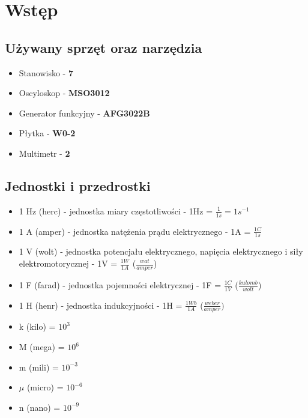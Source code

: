 \chapter{Wstęp}

\section{Używany sprzęt oraz narzędzia}

\begin{itemize}
    \item Stanowisko - \textbf{7}
    \item Oscyloskop - \textbf{MSO3012}
    \item Generator funkcyjny - \textbf{AFG3022B}
    \item Płytka - \textbf{W0-2}
    \item Multimetr - \textbf{2}
\end{itemize}

\section{Jednostki i przedrostki}

\begin{itemize}
    \item 1 Hz (herc) - jednostka miary częstotliwości - 1Hz = $\frac{1}{1s} = 1s^{-1}$
    \item 1 A (amper) - jednostka natężenia prądu elektrycznego - 1A = $\frac{1C}{1s}$
    \item 1 V (wolt) - jednostka potencjału elektrycznego, napięcia elektrycznego i siły elektromotorycznej - 1V = $\frac{1W}{1A}$ ($\frac{wat}{amper}$)
    \item 1 F (farad) - jednostka pojemności elektrycznej - 1F = $\frac{1C}{1V}$ ($\frac{kulomb}{wolt}$)
    \item 1 H (henr) - jednostka indukcyjności - 1H = $\frac{1 Wb}{1 A}$ ($\frac{weber}{amper})$
\end{itemize}

\begin{itemize}
    \item k (kilo) = $10^3$
    \item M (mega) = $10^6$
    \item m (mili) = $10^{-3}$
    \item $\mu$ (micro) = $10^{-6}$
    \item n (nano) = $10^{-9}$
\end{itemize}

